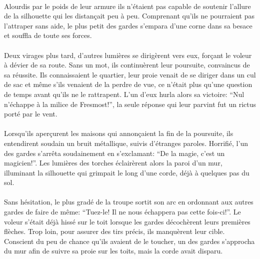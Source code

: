 \paragraph{}
Alourdis par le poids de leur armure ils n'étaient pas capable de soutenir
l'allure de la silhouette qui les distançait peu à peu. Comprenant qu'ils ne
pourraient pas l'attraper sans aide, le plus petit des gardes s'empara d'une
corne dans sa besace et souffla de toute ses forces.

\paragraph{}
Deux virages plus tard, d'autres lumières se dirigèrent vers eux, forçant le
voleur à dévier de sa route. Sans un mot, ils continuèrent leur poursuite,
convaincus de sa réussite. Ils connaissaient le quartier, leur proie venait
de se diriger dans un cul de sac et même s'ils venaient de la perdre de vue,
ce n'était plus qu'une question de temps avant qu'ils ne le rattrapent. L'un
d'eux hurla alors sa victoire: ``Nul n'échappe à la milice de Fresmost!'', la
seule réponse qui leur parvint fut un rictus porté par le vent.

\paragraph{}
Lorsqu'ils aperçurent les maisons qui annonçaient la fin de la poursuite, ils
entendirent soudain un bruit métallique, suivis d'étranges paroles. Horrifié,
l'un des gardes s'arrêta soudainement en s'exclamant: ``De la magie, c'est un
magicien!''. Les lumières des torches éclairèrent alors la paroi d'un mur,
illuminant la silhouette qui grimpait le long d'une corde, déjà à quelques pas
du sol.

\paragraph{}
Sans hésitation, le plus gradé de la troupe sortit son arc en ordonnant aux
autres gardes de faire de même: ``Tuez-le! Il ne nous échappera pas cette
fois-ci!''. Le voleur s'était déjà hissé sur le toit lorsque les gardes
décochèrent leurs premières flèches. Trop loin, pour assurer des tirs précis,
ils manquèrent leur cible. Conscient du peu de chance qu'ils avaient de le
toucher, un des gardes s'approcha du mur afin de suivre sa proie sur les
toits, mais la corde avait disparu.

\contextswitch

